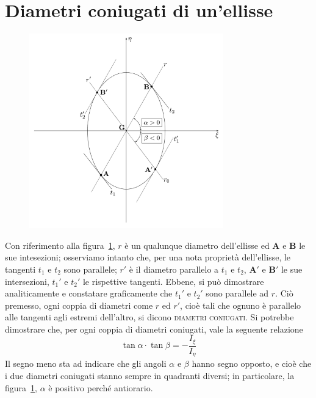 \section{Diametri coniugati di un'ellisse}
\renewcommand{\thefigure}{6~-~2}
\begin{figure}[h]
\centering
\includegraphics[width=0.75\textwidth]{Immagini/Parte_6/Figura6_2/Figura6_2.pdf}
\caption{}
\label{figura6-2}
\end{figure}
Con riferimento alla figura~\ref{figura6-2}, $r$ è un qualunque diametro dell'ellisse ed $\mathbf{A}$ e $\mathbf{B}$ le sue intesezioni; osserviamo intanto che, per una nota proprietà dell'ellisse, le tangenti $t_1$ e $t_2$ sono parallele; $r'$ è il diametro parallelo a $t_1$ e $t_2$, $\mathbf{A}'$ e $\mathbf{B}'$ le sue intersezioni, $t_{1}'$ e $t_{2}'$ le rispettive tangenti. Ebbene, si può dimostrare analiticamente e constatare graficamente che  $t_{1}'$ e $t_{2}'$ sono parallele ad $r$. Ciò premesso, ogni coppia di diametri come $r$ ed $r'$, cioè tali che ognuno è parallelo alle tangenti agli estremi dell'altro, si dicono \textsc{diametri coniugati}. Si potrebbe dimostrare che, per ogni coppia di diametri coniugati, vale la seguente relazione 
\begin{equation} \label{equazione6-3}
\boxed{\tan\alpha\cdot\tan\beta = -\frac{I_{\xi}}{I_{\eta}}}
\tag{6.3}
\end{equation}
Il segno meno sta ad indicare che gli angoli $\alpha$ e $\beta$ hanno segno opposto, e cioè che i due diametri coniugati stanno sempre in quadranti diversi; in particolare, la figura~\ref{figura6-2}, $\alpha$ è positivo perché antiorario. 

